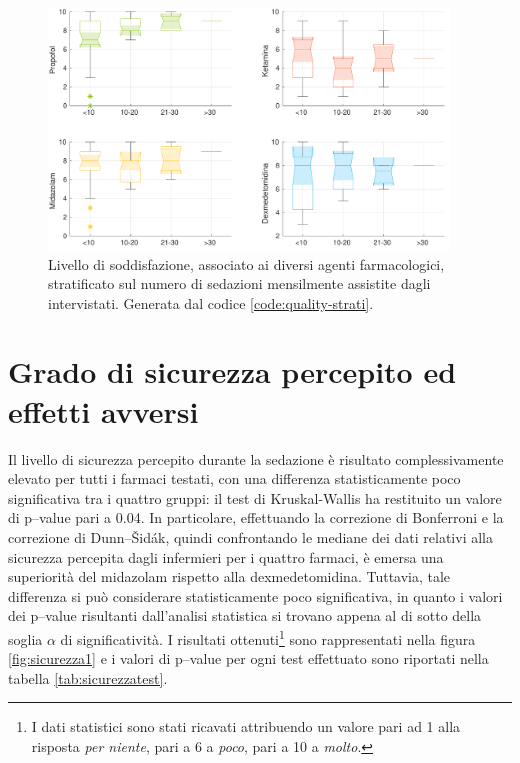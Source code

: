 \vfill
\begin{figure}[!h]
    \centering
    \includegraphics[width=0.95\textwidth]{Figure/qualita-strat-frequenza.pdf}
    \caption{Livello di soddisfazione, associato ai diversi agenti farmacologici, stratificato sul numero di sedazioni mensilmente assistite dagli intervistati. Generata dal codice \ref{code:quality-strati}.}
    \label{fig:qualitafrequenza}
\end{figure}

\vfill
\newpage

\vfill
\section{Grado di sicurezza percepito ed effetti avversi}

Il livello di sicurezza percepito durante la sedazione è risultato complessivamente elevato per tutti i farmaci testati, con una differenza statisticamente poco significativa tra i quattro gruppi: il test di Kruskal-Wallis ha restituito un valore di p--value pari a 0.04. In particolare, effettuando la correzione di Bonferroni e la correzione di Dunn--Šidák, quindi confrontando le mediane dei dati relativi alla sicurezza percepita dagli infermieri per i quattro farmaci, è emersa una superiorità del midazolam rispetto alla dexmedetomidina. Tuttavia, tale differenza si può considerare statisticamente poco significativa, in quanto i valori dei p--value risultanti dall'analisi statistica si trovano appena al di sotto della soglia $\alpha$ di significatività. I risultati ottenuti\footnote{I dati statistici sono stati ricavati attribuendo un valore pari ad 1 alla risposta \emph{per niente}, pari a 6 a \emph{poco}, pari a 10 a \emph{molto}.} sono rappresentati nella figura \ref{fig:sicurezza1} e i valori di p--value per ogni test effettuato sono riportati nella tabella \ref{tab:sicurezzatest}.

